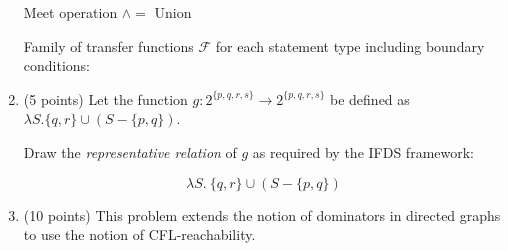 \documentclass[12pt]{article}
\begin{document}
\begin{enumerate}
\begin{mdframed}
        Meet operation $\wedge = $ Union 

        Family of transfer functions $\mathcal{F}$ for each statement type
        including boundary conditions:  %

      \end{mdframed}

    \clearpage
      \item (5 points) Let the function $g: 2^{\{p,q,r, s\}} \rightarrow 2^{\{p,q,r,s\}}$ be defined 
      as $\lambda S. \{q, r\} \cup (S - \{p, q \})$. 
    
      Draw the \emph{representative relation} of $g$ as required by the IFDS framework:
    
      \begin{mdframed}
                    
            \[
            \lambda S.\ \{q, r\} \cup (S - \{p, q\})
            \]
            
            \begin{center}
            \end{center}
                    
      \end{mdframed}

      \clearpage
      \item (10 points) This problem extends the notion of dominators in
      directed graphs to use the notion of CFL-reachability.


\end{enumerate}
\end{document}
